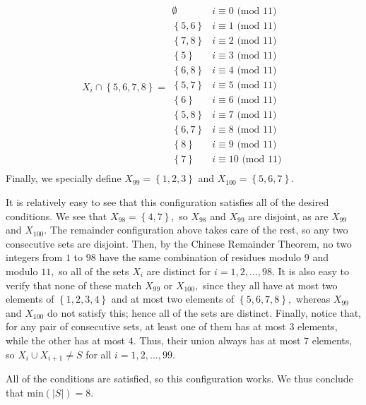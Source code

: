 \begin{enumerate}
 \[X_i\cap\left\{ {5, 6, 7, 8} \right\} = \begin{array}{ll}       \emptyset & i\equiv 0 \text{ (mod } 11\text{)} \\       \left\{ {5, 6} \right\} & i\equiv 1 \text{ (mod } 11\text{)} \\       \left\{ {7, 8} \right\} & i\equiv 2 \text{ (mod } 11\text{)} \\       \left\{ {5} \right\} & i\equiv 3 \text{ (mod } 11\text{)} \\       \left\{ {6, 8} \right\} & i\equiv 4 \text{ (mod } 11\text{)} \\       \left\{ {5, 7} \right\} & i\equiv 5 \text{ (mod } 11\text{)} \\       \left\{ {6} \right\} & i\equiv 6 \text{ (mod } 11\text{)} \\       \left\{ {5, 8} \right\} & i\equiv 7 \text{ (mod } 11\text{)} \\       \left\{ {6, 7} \right\} & i\equiv 8 \text{ (mod } 11\text{)} \\       \left\{ {8} \right\} & i\equiv 9 \text{ (mod } 11\text{)} \\       \left\{ {7} \right\} & i\equiv 10 \text{ (mod } 11\text{)} \\ \end{array}\]Finally, we specially define $X_{99} = \left\{ {1, 2, 3} \right\}$ and $X_{100} = \left\{ {5, 6, 7} \right\}.$

 It is relatively easy to see that this configuration satisfies all of the desired conditions. We see that $X_{98} = \left\{ {4, 7} \right\},$ so $X_{98}$ and $X_{99}$ are disjoint, as are $X_{99}$ and $X_{100}.$ The remainder configuration above takes care of the rest, so any two consecutive sets are disjoint. Then, by the Chinese Remainder Theorem, no two integers from $1$ to $98$ have the same combination of residues modulo $9$ and modulo $11,$ so all of the sets $X_i$ are distinct for $i = 1, 2, ..., 98.$ It is also easy to verify that none of these match $X_{99}$ or $X_{100},$ since they all have at most two elements of $\left\{ {1, 2, 3, 4} \right\}$ and at most two elements of $\left\{ {5, 6, 7, 8} \right\},$ whereas $X_{99}$ and $X_{100}$ do not satisfy this; hence all of the sets are distinct. Finally, notice that, for any pair of consecutive sets, at least one of them has at most $3$ elements, while the other has at most $4.$ Thus, their union always has at most $7$ elements, so $X_i\cup X_{i+1}\neq S$ for all $i = 1, 2, ..., 99.$

 All of the conditions are satisfied, so this configuration works. We thus conclude that $\text{min}\left(\left|S\right|\right) = 8.$




\end{enumerate}

